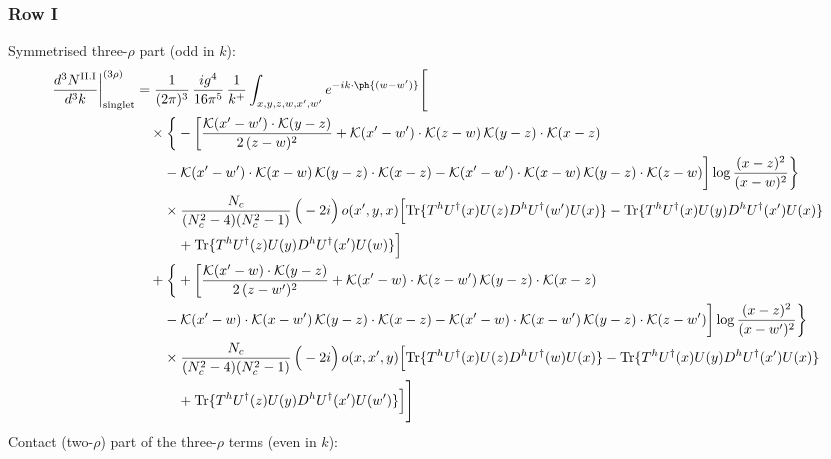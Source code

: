 \subsubsection*{Row I}
Symmetrised three-$\rho$ part (odd in $k$):
\begin{align}
\frac{d^{3}N^{\rm II.I}}{d^{3}k}\bigg|^{(3\rho)}_{\rm singlet}&=\frac{1}{(2\pi)^{3}}\,\frac{ig^{4}}{16\pi^{5}}\,\frac{1}{k^{+}}\int_{x,y,z,w,x',w'}e^{-ik\cdot\ph{(w-w')}}\Bigg[\notag\\
&\quad\times\bigg\{-\bigg[\frac{\mathcal{K}(x'-w')\cdot\mathcal{K}(y-z)}{2\,(z-w)^{2}}+\mathcal{K}(x'-w')\cdot\mathcal{K}(z-w)\,\mathcal{K}(y-z)\cdot\mathcal{K}(x-z)\notag\\
&\qquad-\mathcal{K}(x'-w')\cdot\mathcal{K}(x-w)\,\mathcal{K}(y-z)\cdot\mathcal{K}(x-z)-\mathcal{K}(x'-w')\cdot\mathcal{K}(x-w)\,\mathcal{K}(y-z)\cdot\mathcal{K}(z-w)\bigg]\log\frac{(x-z)^{2}}{(x-w)^{2}}\bigg\}\notag\\
&\qquad\times \frac{N_{c}}{(N_{c}^{2}-4)(N_{c}^{2}-1)}\,\Big(-2i\Big)\,o(x',y,x)\Big[{\rm Tr}\{T^{h}U^{\dagger}(x)U(z)D^{h}U^{\dagger}(w')U(x)\}-{\rm Tr}\{T^{h}U^{\dagger}(x)U(y)D^{h}U^{\dagger}(x')U(x)\}\notag\\
&\qquad\quad +{\rm Tr}\{T^{h}U^{\dagger}(z)U(y)D^{h}U^{\dagger}(x')U(w)\}\Big]\notag\\
&\quad+\bigg\{+\bigg[\frac{\mathcal{K}(x'-w)\cdot\mathcal{K}(y-z)}{2\,(z-w')^{2}}+\mathcal{K}(x'-w)\cdot\mathcal{K}(z-w')\,\mathcal{K}(y-z)\cdot\mathcal{K}(x-z)\notag\\
&\qquad-\mathcal{K}(x'-w)\cdot\mathcal{K}(x-w')\,\mathcal{K}(y-z)\cdot\mathcal{K}(x-z)-\mathcal{K}(x'-w)\cdot\mathcal{K}(x-w')\,\mathcal{K}(y-z)\cdot\mathcal{K}(z-w')\bigg]\log\frac{(x-z)^{2}}{(x-w')^{2}}\bigg\}\notag\\
&\qquad\times \frac{N_{c}}{(N_{c}^{2}-4)(N_{c}^{2}-1)}\,\Big(-2i\Big)\,o(x,x',y)\Big[{\rm Tr}\{T^{h}U^{\dagger}(x)U(z)D^{h}U^{\dagger}(w)U(x)\}-{\rm Tr}\{T^{h}U^{\dagger}(x)U(y)D^{h}U^{\dagger}(x')U(x)\}\notag\\
&\qquad\quad +{\rm Tr}\{T^{h}U^{\dagger}(z)U(y)D^{h}U^{\dagger}(x')U(w')\}\Big]\Bigg]\label{eq:E-II.I-3}
\end{align}
Contact (two-$\rho$) part of the three-$\rho$ terms (even in $k$):
